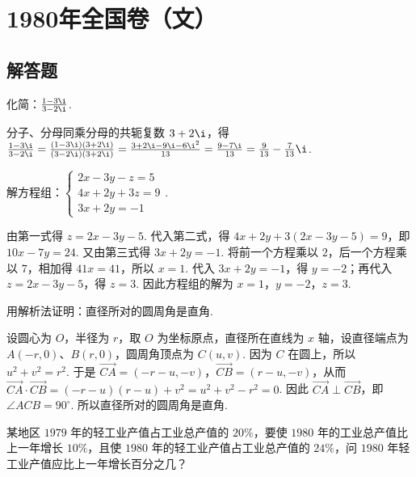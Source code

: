 \chapter{1980年全国卷（文）}
\section{解答题}

\begin{problem}
化简：\(\frac{1-3\i}{3-2\i}\).
\end{problem}

\begin{solution}
分子、分母同乘分母的共轭复数 \(3+2\i\)，得
\(\frac{1-3\i}{3-2\i}=\frac{(1-3\i)(3+2\i)}{(3-2\i)(3+2\i)}=\frac{3+2\i-9\i-6\i^2}{13}=\frac{9-7\i}{13}=\frac{9}{13}-\frac{7}{13}\i\).
\end{solution}

\begin{problem}
解方程组：\(\begin{cases}
2x-3y-z=5\\
4x+2y+3z=9\\
3x+2y=-1
\end{cases}\).
\end{problem}

\begin{solution}
由第一式得 \(z=2x-3y-5\). 代入第二式，得 \(4x+2y+3(2x-3y-5)=9\)，即 \(10x-7y=24\). 又由第三式得 \(3x+2y=-1\). 将前一个方程乘以 \(2\)，后一个方程乘以 \(7\)，相加得 \(41x=41\)，所以 \(x=1\). 代入 \(3x+2y=-1\)，得 \(y=-2\)；再代入 \(z=2x-3y-5\)，得 \(z=3\). 因此方程组的解为 \(x=1\)，\(y=-2\)，\(z=3\).
\end{solution}

\begin{problem}
用解析法证明：直径所对的圆周角是直角.
\end{problem}

\begin{solution}
设圆心为 \(O\)，半径为 \(r\)，取 \(O\) 为坐标原点，直径所在直线为 \(x\) 轴，设直径端点为 \(A(-r,0)\)、\(B(r,0)\)，圆周角顶点为 \(C(u,v)\). 因为 \(C\) 在圆上，所以 \(u^2+v^2=r^2\). 于是 \(\overrightarrow{CA}=(-r-u,-v)\)，\(\overrightarrow{CB}=(r-u,-v)\)，从而
\(\overrightarrow{CA}\cdot\overrightarrow{CB}=(-r-u)(r-u)+v^2=u^2+v^2-r^2=0\). 因此 \(\overrightarrow{CA}\perp\overrightarrow{CB}\)，即 \(\angle ACB=90^\circ\). 所以直径所对的圆周角是直角.
\end{solution}

\begin{problem}
某地区 \(1979\) 年的轻工业产值占工业总产值的 \(20\%\)，要使 \(1980\) 年的工业总产值比上一年增长 \(10\%\)，且使 \(1980\) 年的轻工业产值占工业总产值的 \(24\%\)，问 \(1980\) 年轻工业产值应比上一年增长百分之几？
\end{problem}

